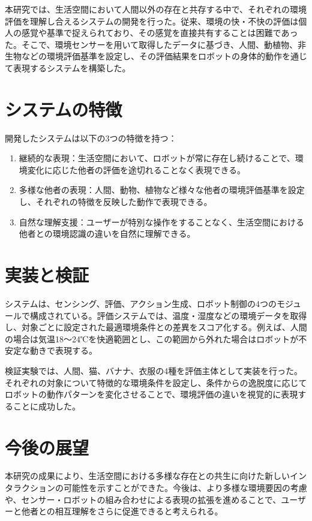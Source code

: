 \documentclass[paper=a4paper,jafontsize=9pt,head_space=15mm,gutter=20mm,
twocolumn,number_of_lines=49, line_length=26zw]{myuarticle}
\begin{document}
本研究では、生活空間において人間以外の存在と共存する中で、それぞれの環境評価を理解し合えるシステムの開発を行った。従来、環境の快・不快の評価は個人の感覚や基準で捉えられており、その感覚を直接共有することは困難であった。そこで、環境センサーを用いて取得したデータに基づき、人間、動植物、非生物などの環境評価基準を設定し、その評価結果をロボットの身体的動作を通じて表現するシステムを構築した。

\section*{システムの特徴}
開発したシステムは以下の3つの特徴を持つ：

\begin{enumerate}
  \item 継続的な表現：生活空間において、ロボットが常に存在し続けることで、環境変化に応じた他者の評価を途切れることなく表現できる。
  \item 多様な他者の表現：人間、動物、植物など様々な他者の環境評価基準を設定し、それぞれの特徴を反映した動作で表現できる。
  \item 自然な理解支援：ユーザーが特別な操作をすることなく、生活空間における他者との環境認識の違いを自然に理解できる。
\end{enumerate}

\section*{実装と検証}
システムは、センシング、評価、アクション生成、ロボット制御の4つのモジュールで構成されている。評価システムでは、温度・湿度などの環境データを取得し、対象ごとに設定された最適環境条件との差異をスコア化する。例えば、人間の場合は気温18〜24℃を快適範囲とし、この範囲から外れた場合はロボットが不安定な動きで表現する。

検証実験では、人間、猫、バナナ、衣服の4種を評価主体として実装を行った。それぞれの対象について特徴的な環境条件を設定し、条件からの逸脱度に応じてロボットの動作パターンを変化させることで、環境評価の違いを視覚的に表現することに成功した。

\section*{今後の展望}
本研究の成果により、生活空間における多様な存在との共生に向けた新しいインタラクションの可能性を示すことができた。今後は、より多様な環境要因の考慮や、センサー・ロボットの組み合わせによる表現の拡張を進めることで、ユーザーと他者との相互理解をさらに促進できると考えられる。
\end{document}
